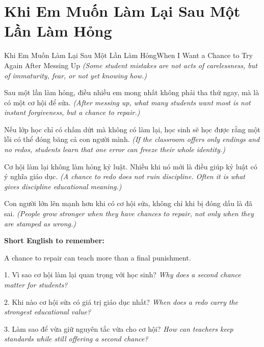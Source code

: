 \section{Khi Em Muốn Làm Lại Sau Một Lần Làm Hỏng}
\begin{truyen}{Khi Em Muốn Làm Lại Sau Một Lần Làm Hỏng}{When I Want a Chance to Try Again After Messing Up}
\textit{(Some student mistakes are not acts of carelessness, but of immaturity, fear, or not yet knowing how.)}

Sau một lần làm hỏng, điều nhiều em mong nhất không phải tha thứ ngay, mà là có một cơ hội để sửa.
\textit{(After messing up, what many students want most is not instant forgiveness, but a chance to repair.)}

Nếu lớp học chỉ có chấm dứt mà không có làm lại, học sinh sẽ học được rằng một lỗi có thể đóng băng cả con người mình.
\textit{(If the classroom offers only endings and no redos, students learn that one error can freeze their whole identity.)}

Cơ hội làm lại không làm hỏng kỷ luật. Nhiều khi nó mới là điều giúp kỷ luật có ý nghĩa giáo dục.
\textit{(A chance to redo does not ruin discipline. Often it is what gives discipline educational meaning.)}
\end{truyen}

\begin{baihoc}
Con người lớn lên mạnh hơn khi có cơ hội sửa, không chỉ khi bị đóng dấu là đã sai.
\textit{(People grow stronger when they have chances to repair, not only when they are stamped as wrong.)}
\end{baihoc}

\begin{ghinhoanh}
\textbf{Short English to remember:}

A chance to repair can teach more than a final punishment.

\end{ghinhoanh}

\begin{tuhocnhanh}
1. Vì sao cơ hội làm lại quan trọng với học sinh? \textit{Why does a second chance matter for students?}

2. Khi nào cơ hội sửa có giá trị giáo dục nhất? \textit{When does a redo carry the strongest educational value?}

3. Làm sao để vừa giữ nguyên tắc vừa cho cơ hội? \textit{How can teachers keep standards while still offering a second chance?}
\end{tuhocnhanh}
\ngancach

